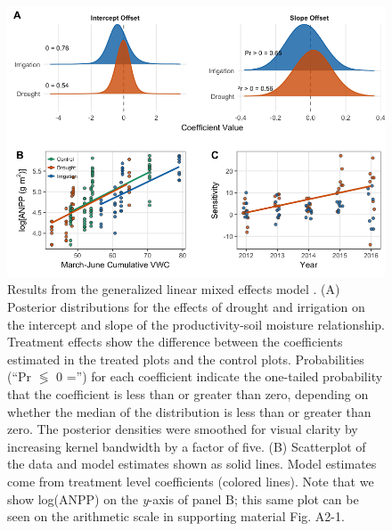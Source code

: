\documentclass[fleqn,10pt,lineno]{wlpeerj} %
\begin{document}
\begin{figure}[!ht]
  \centering
      \includegraphics[width=5in]{../figures/glmm_main_results.png}
  \caption{Results from the generalized linear mixed effects model . (A) Posterior distributions for the effects of drought and irrigation on the intercept and slope of the productivity-soil moisture relationship. Treatment effects show the difference between the coefficients estimated in the treated plots and the control plots. Probabilities (``Pr $\lessgtr$ 0 ='') for each coefficient indicate the one-tailed probability that the coefficient is less than or greater than zero, depending on whether the median of the distribution is less than or greater than zero. The posterior densities were smoothed for visual clarity by increasing kernel bandwidth by a factor of five. (B) Scatterplot of the data and model estimates shown as solid lines. Model estimates come from treatment level coefficients (colored lines). Note that we show log(ANPP) on the \emph{y}-axis of panel B; this same plot can be seen on the arithmetic scale in supporting material Fig. A2-1. }
\end{figure}

\newpage{}
\end{document}
